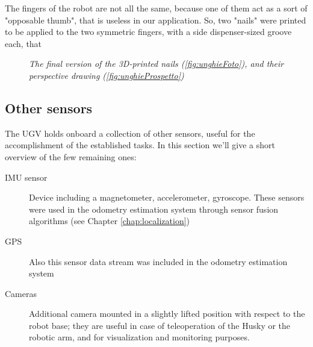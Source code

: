 The fingers of the robot are not all the same, because one of them act as a sort of "opposable thumb", that is useless in our application. So, two "nails" were printed to be applied to the two symmetric fingers, with a side dispenser-sized groove each, that 

\begin{figure}
	\centering
	\caption{\textit{The final version of the 3D-printed nails (\ref{fig:unghieFoto}), and their 	perspective drawing (\ref{fig:unghieProspetto})}}
\end{figure}



\subsection{Other sensors}
The \ac{UGV} holds onboard a collection of other sensors, useful for the accomplishment of the established tasks. In this section we'll give a short overview of the few remaining ones:
\begin{description}
	\item[{IMU} sensor] Device including a magnetometer, accelerometer, gyroscope. These sensors were used in the odometry estimation system through sensor fusion algorithms (see Chapter \ref{chap:localization})
	\item[GPS] Also this sensor data stream was included in the odometry estimation system
	\item [Cameras] Additional camera mounted in a slightly lifted position with respect to the robot base; they are useful in case of teleoperation of the Husky or the robotic arm, and for visualization and monitoring purposes.
\end{description}

